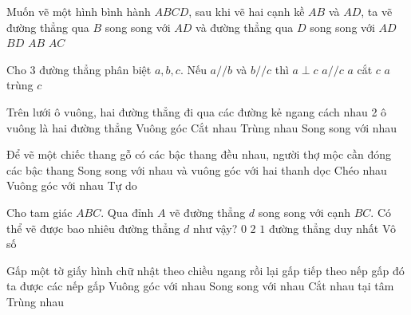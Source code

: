 \begin{ex} %
Muốn vẽ một hình bình hành $ABCD$, sau khi vẽ hai cạnh kề $AB$ và $AD$, ta vẽ đường thẳng qua $B$ song song với $AD$ và đường thẳng qua $D$ song song với
\choice
{$AD$}
{$BD$}
{\True $AB$}
{$AC$}
\end{ex}

\begin{ex} %
Cho 3 đường thẳng phân biệt $a, b, c$. Nếu $a // b$ và $b // c$ thì
\choice
{$a \perp c$}
{\True $a // c$}
{$a$ cắt $c$}
{$a$ trùng $c$}
\end{ex}

\begin{ex} %
Trên lưới ô vuông, hai đường thẳng đi qua các đường kẻ ngang cách nhau 2 ô vuông là hai đường thẳng
\choice
{Vuông góc}
{Cắt nhau}
{Trùng nhau}
{\True Song song với nhau}
\end{ex}

\begin{ex} %
Để vẽ một chiếc thang gỗ có các bậc thang đều nhau, người thợ mộc cần đóng các bậc thang
\choice
{\True Song song với nhau và vuông góc với hai thanh dọc}
{Chéo nhau}
{Vuông góc với nhau}
{Tự do}
\end{ex}

\begin{ex} %
Cho tam giác $ABC$. Qua đỉnh $A$ vẽ đường thẳng $d$ song song với cạnh $BC$. Có thể vẽ được bao nhiêu đường thẳng $d$ như vậy?
\choice
{$0$}
{$2$}
{\True $1$ đường thẳng duy nhất}
{Vô số}
\end{ex}

\begin{ex} %
Gấp một tờ giấy hình chữ nhật theo chiều ngang rồi lại gấp tiếp theo nếp gấp đó ta được các nếp gấp
\choice
{Vuông góc với nhau}
{\True Song song với nhau}
{Cắt nhau tại tâm}
{Trùng nhau}
\end{ex}

